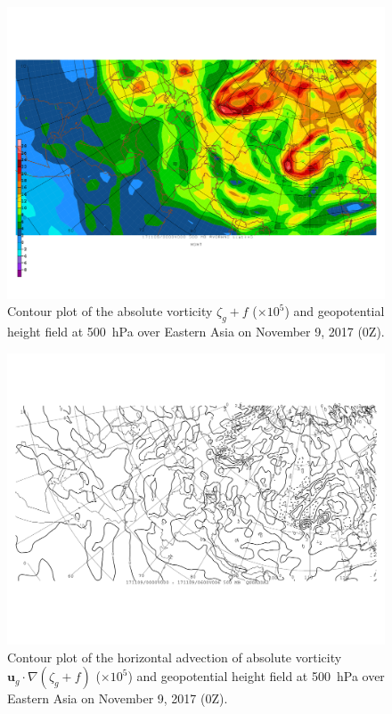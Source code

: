 \documentclass[11pt]{article}
\begin{document}
\begin{figure}[h!]
	\centering
	\includegraphics[width=\textwidth]{avorwnd_500hPa_China}
	\caption{Contour plot of the absolute vorticity $\zeta_g + f$ ($\times 10^5$) and geopotential height field at \SI{500}{\hecto\Pa} over Eastern Asia on November 9, 2017 (0Z).}
	\label{fig:avorwnd_500hPa_China}
\end{figure}

\begin{figure}[h!]
	\centering
	\includegraphics[width=\textwidth]{horizontal_advection_avor_500hPa_China}
	\caption{Contour plot of the horizontal advection of absolute vorticity $\bm{u}_g \cdot \nabla(\zeta_g + f)$ ($\times 10^5$) and geopotential height field at \SI{500}{\hecto\Pa} over Eastern Asia on November 9, 2017 (0Z).}
	\label{fig:horizontal_advection_avor_500hPa_China}
\end{figure}
\end{document}
